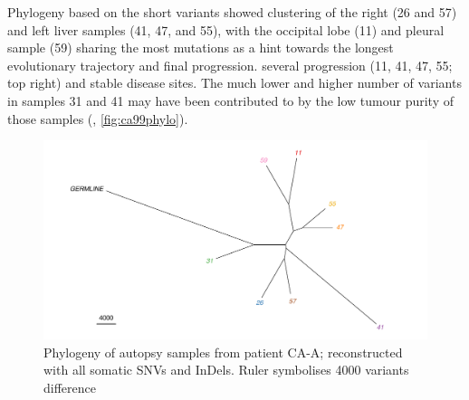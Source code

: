 Phylogeny based on the short variants showed  clustering of the right (26 and 57) and left liver samples (41, 47, and 55), with the occipital lobe (11) and pleural sample (59) sharing the most mutations as a hint towards the longest evolutionary trajectory and final progression.  several progression (11, 41, 47, 55; top right) and stable disease sites. The much lower and higher number of variants in  samples 31 and 41 may have been contributed to by the low tumour purity of those samples (, \autoref{fig:ca99phylo}).

\begin{figure}[htp]
	\centering
	\includegraphics[width=.99\linewidth]{Figures/CASCADE/CA99/CA99phylo.pdf}
	\caption[Phylogeny of autopsy samples from patient CA-A]{Phylogeny of autopsy samples from patient CA-A; reconstructed with all somatic SNVs and InDels. Ruler symbolises 4000 variants difference} \label{fig:ca99phylo}
\end{figure}

